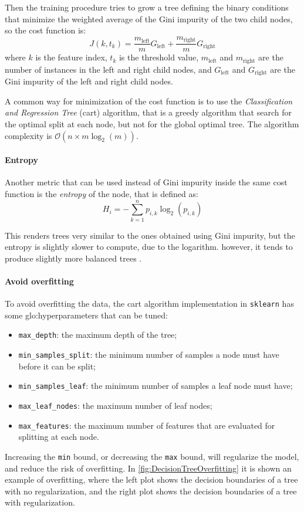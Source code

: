 Then the training procedure tries to grow a tree defining the binary conditions that minimize the weighted average of the Gini impurity of the two child nodes, so the cost function is:
\begin{equation}
    J(k, t_k) = \frac{m_{\text{left}}}{m}G_{\text{left}} + \frac{m_{\text{right}}}{m}G_{\text{right}}
\end{equation}
where $k$ is the feature index, $t_k$ is the threshold value, $m_{\text{left}}$ and $m_{\text{right}}$ are the number of instances in the left and right child nodes, and $G_{\text{left}}$ and $G_{\text{right}}$ are the Gini impurity of the left and right child nodes.

A common way for minimization of the cost function is to use the \emph{Classification and Regression Tree} (\gls{cart}) algorithm, that is a greedy algorithm that search for the optimal split at each node, but not for the global optimal tree. The algorithm complexity is $\mathcal{O}(n \times m \log_2(m))$.

\paragraph{Entropy}
Another metric that can be used instead of Gini impurity inside the same cost function is the \emph{entropy} of the node, that is defined as:
\begin{equation}
    H_i = - \sum_{k=1}^{n}p_{i,k}\log_2(p_{i,k})
\end{equation}

This renders trees very similar to the ones obtained using Gini impurity, but the entropy is slightly slower to compute, due to the logarithm. however, it tends to produce slightly more balanced trees \cite{raschka2013decisiontrees}.

\paragraph{Avoid overfitting}
To avoid overfitting the data, the \gls{cart} algorithm implementation in \texttt{sklearn} has some \gls{glo:hyperparameter}s that can be tuned:
\begin{itemize}
    \item \texttt{max\_depth}: the maximum depth of the tree;
    \item \texttt{min\_samples\_split}: the minimum number of samples a node must have before it can be split;
    \item \texttt{min\_samples\_leaf}: the minimum number of samples a leaf node must have;
    \item \texttt{max\_leaf\_nodes}: the maximum number of leaf nodes;
    \item \texttt{max\_features}: the maximum number of features that are evaluated for splitting at each node.
\end{itemize}
Increasing the \texttt{min} bound, or decreasing the \texttt{max} bound, will regularize the model, and reduce the risk of overfitting.
In \autoref{fig:DecisionTreeOverfitting} it is shown an example of overfitting, where the left plot shows the decision boundaries of a tree with no regularization, and the right plot shows the decision boundaries of a tree with regularization.

